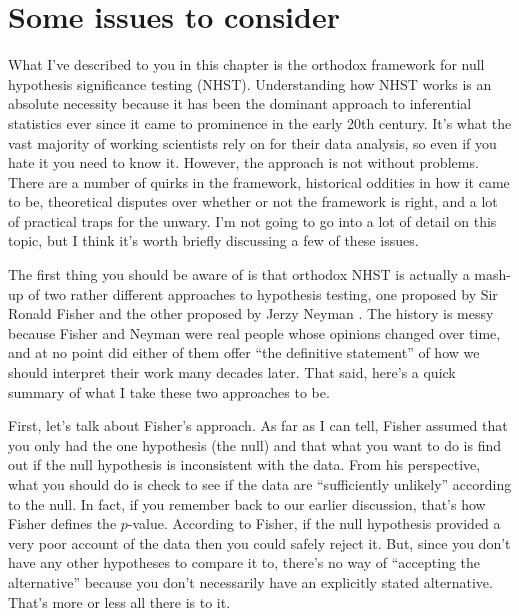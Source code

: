 \section{Some issues to consider~\label{sec:nhstmess}}

What I've described to you in this chapter is the orthodox framework for null hypothesis significance testing (NHST). Understanding how NHST works is an absolute necessity because it has been the dominant approach to inferential statistics ever since it came to prominence in the early 20th century. It's what the vast majority of working scientists rely on for their data analysis, so even if you hate it you need to know it. However, the approach is not without problems. There are a number of quirks in the framework, historical oddities in how it came to be, theoretical disputes over whether or not the framework is right, and a lot of practical traps for the unwary. I'm not going to go into a lot of detail on this topic, but I think it's worth briefly discussing a few of these issues.


The first thing you should be aware of is that orthodox NHST is actually a mash-up of two rather different approaches to hypothesis testing, one proposed by Sir Ronald Fisher and the other proposed by Jerzy Neyman \parencite[see][for a historical summary]{Lehmann2011}. The history is messy because Fisher and Neyman were real people whose opinions changed over time, and at no point did either of them offer ``the definitive statement'' of how we should interpret their work many decades later. That said, here's a quick summary of what I take these two approaches to be. 

First, let's talk about Fisher's approach. As far as I can tell, Fisher assumed that you only had the one hypothesis (the null) and that what you want to do is find out if the null hypothesis is inconsistent with the data. From his perspective, what you should do is check to see if the data are ``sufficiently unlikely'' according to the null. In fact, if you remember back to our earlier discussion, that's how Fisher defines the $p$-value. According to Fisher, if the null hypothesis provided a very poor account of the data then you could safely reject it. But, since you don't have any other hypotheses to compare it to, there's no way of ``accepting the alternative'' because you don't necessarily have an explicitly stated alternative. That's more or less all there is to it. 

